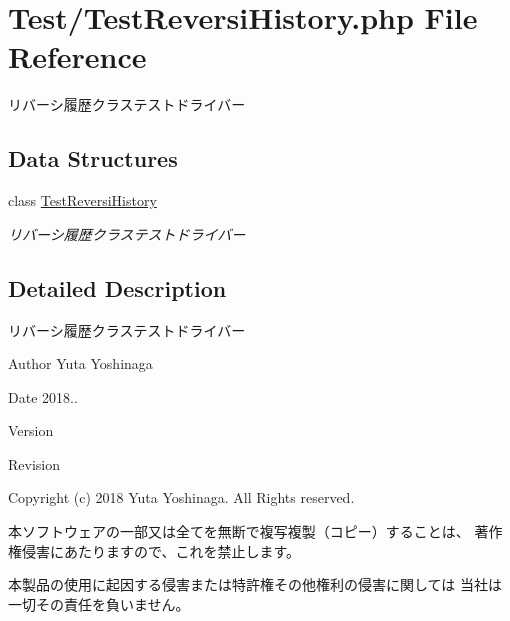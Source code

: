 \hypertarget{_test_reversi_history_8php}{}\section{Test/\+Test\+Reversi\+History.php File Reference}
\label{_test_reversi_history_8php}


リバーシ履歴クラステストドライバー  


\subsection*{Data Structures}
\begin{DoxyCompactItemize}
\item 
class \hyperlink{class_test_reversi_history}{Test\+Reversi\+History}
\begin{DoxyCompactList}\small\item\em リバーシ履歴クラステストドライバー \end{DoxyCompactList}\end{DoxyCompactItemize}


\subsection{Detailed Description}
リバーシ履歴クラステストドライバー 

\begin{DoxyAuthor}{Author}
Yuta Yoshinaga 
\end{DoxyAuthor}
\begin{DoxyDate}{Date}
2018.. 
\end{DoxyDate}
\begin{DoxyParagraph}{Version}

\end{DoxyParagraph}
\begin{DoxyParagraph}{Revision}

\end{DoxyParagraph}


Copyright (c) 2018 Yuta Yoshinaga. All Rights reserved.


\begin{DoxyItemize}
\item 本ソフトウェアの一部又は全てを無断で複写複製（コピー）することは、 著作権侵害にあたりますので、これを禁止します。
\item 本製品の使用に起因する侵害または特許権その他権利の侵害に関しては 当社は一切その責任を負いません。 
\end{DoxyItemize}